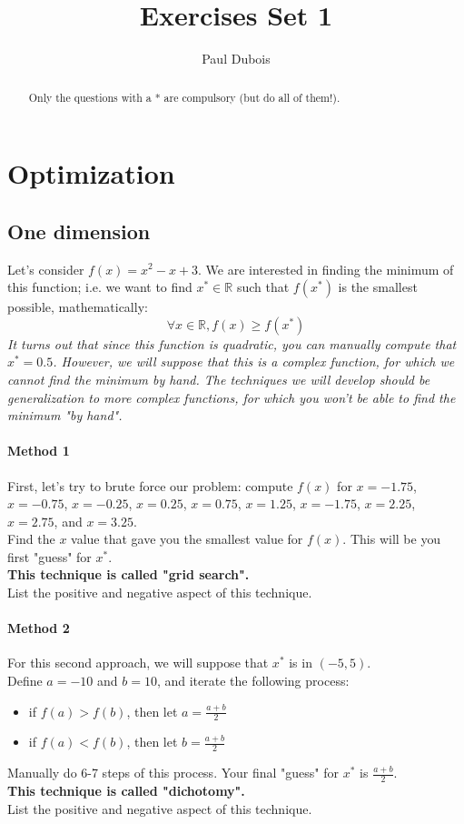 \documentclass[]{article}
\title{Exercises Set 1}
\author{Paul Dubois}
\newcommand{\R}{\mathbb{R}}
\begin{document}
	
	\maketitle
	
	\begin{abstract}
		Only the questions with a * are compulsory (but do all of them!).
	\end{abstract}
	
	\section{Optimization}
	\subsection{One dimension}
	Let's consider $f(x) = x^2-x+3$.
	We are interested in finding the minimum of this function; 
	i.e. we want to find $x^* \in \R$ such that $f(x^*)$ is the smallest possible, mathematically:
	$$\forall x\in \R, f(x) \geq f(x^*)$$
	\textit{It turns out that since this function is quadratic, you can manually compute that $x^*=0.5$.
		However, we will suppose that this is a complex function, for which we cannot find the minimum by hand.
		The techniques we will develop should be generalization to more complex functions, for which you won't be able to find the minimum "by hand".}
	
	\paragraph{Method 1}
	First, let's try to brute force our problem: compute $f(x)$ for $x=-1.75$, $x=-0.75$, $x=-0.25$, $x=0.25$, $x=0.75$, $x=1.25$, $x=-1.75$, $x=2.25$, $x=2.75$, and $x=3.25$.\\
	Find the $x$ value that gave you the smallest value for $f(x)$.
	This will be you first "guess" for $x^*$.\\
	\textbf{This technique is called "grid search".}\\
	List the positive and negative aspect of this technique.
	
	\paragraph{Method 2}
	For this second approach, we will suppose that $x^*$ is in $(-5,5)$.\\
	Define $a=-10$ and $b=10$, and iterate the following process:
	\begin{itemize}
		\item if $f(a)>f(b)$, then let $a = \frac{a+b}{2}$
		\item if $f(a)<f(b)$, then let $b = \frac{a+b}{2}$
	\end{itemize}
	Manually do 6-7 steps of this process.
	Your final "guess" for $x^*$ is $\frac{a+b}{2}$.\\
	\textbf{This technique is called "dichotomy".}\\
	List the positive and negative aspect of this technique.
	
\end{document}
